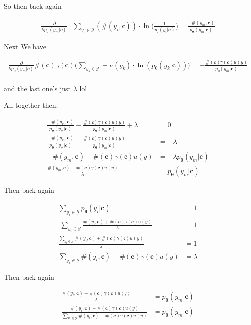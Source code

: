 \documentclass{article}
\newcommand{\vtheta}{\boldsymbol{\theta}}
\newcommand{\model}{p_{\vtheta}}
\newcommand{\context}{\boldsymbol{c}}
\begin{document}
			So then back again
		
			\begin{align}
				\frac{\partial}{\partial \model(y_m|\context)} &\sum_{y_i\in\mathcal{Y}} (\#(y_i, \context))\cdot  \ln\bigg(\frac{1}{\model(y_i|\context)} 	\bigg)  =  \frac{-\#(y_m, \context)}{\model(y_m|\context)}
			\end{align}
			
			Next We have
			
			\begin{align}
				\frac{\partial}{\partial \model(y_m|\context)} \#(\context)\gamma(\context)\bigg(\sum_{y_k\in\mathcal{Y}} - u(y_k)\cdot\ln(\model(y_k|\context))\bigg) = -\frac{\#(\context)\gamma(\context)u(y)}{\model(y_m|\context)} \\
			\end{align}	
		
			and the last one's just $\lambda$ lol
			
			All together then:
			
			\begin{align}
				\frac{-\#(y_m, \context)}{\model(y_m|\context)} -\frac{\#(\context)\gamma(\context)u(y)}{\model(y_m|\context)} +\lambda &= 0\\
				\frac{-\#(y_m, \context)}{\model(y_m|\context)} -\frac{\#(\context)\gamma(\context)u(y)}{\model(y_m|\context)}  &= -\lambda	\\
				-\#(y_m, \context) -\#(\context)\gamma(\context)u(y)  &= -\lambda \model(y_m|\context)\\
				\frac{\#(y_m, \context) +\#(\context)\gamma(\context)u(y)}{\lambda}  &= \model(y_m|\context)	
			\end{align}
		
			Then back again
			
			\begin{align}
				\sum_{y_i\in\mathcal{Y}} \model(y_i|\context) &= 1\\\
				\sum_{y_i\in\mathcal{Y}} \frac{\#(y_i, \context) +\#(\context)\gamma(\context)u(y)}{\lambda} &= 1\\
				\frac{ \sum_{y_i\in\mathcal{Y}} \#(y_i, \context) +\#(\context)\gamma(\context)u(y)}{\lambda} &= 1\\
				 \sum_{y_i\in\mathcal{Y}} \#(y_i, \context) +\#(\context)\gamma(\context)u(y) &= \lambda
			\end{align}
			
			Then back again
		
			\begin{align}
				\frac{\#(y_i, \context) +\#(\context)\gamma(\context)u(y)}{\lambda}  &= \model(y_m|\context)\\
				\frac{\#(y_i, \context) +\#(\context)\gamma(\context)u(y)}{\sum_{y_i\in\mathcal{Y}} \#(y_i, \context) +\#(\context)\gamma(\context)u(y)}  &= \model(y_m|\context)	
			\end{align}
			
\end{document}
